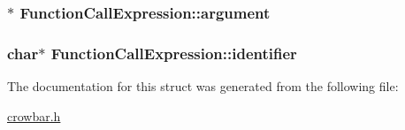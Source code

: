 \subsubsection[{argument}]{$\ast$ Function\+Call\+Expression\+::argument}\label{struct_function_call_expression_a278e6d5a95113ab48d019026c4e5641d}
\hypertarget{struct_function_call_expression_a9c3a09de854a826e104f65297edd184b}{}
\subsubsection[{identifier}]{\setlength{\rightskip}{0pt plus 5cm}char$\ast$ Function\+Call\+Expression\+::identifier}\label{struct_function_call_expression_a9c3a09de854a826e104f65297edd184b}


The documentation for this struct was generated from the following file\+:\begin{DoxyCompactItemize}
\item 
\hyperlink{crowbar_8h}{crowbar.\+h}\end{DoxyCompactItemize}
